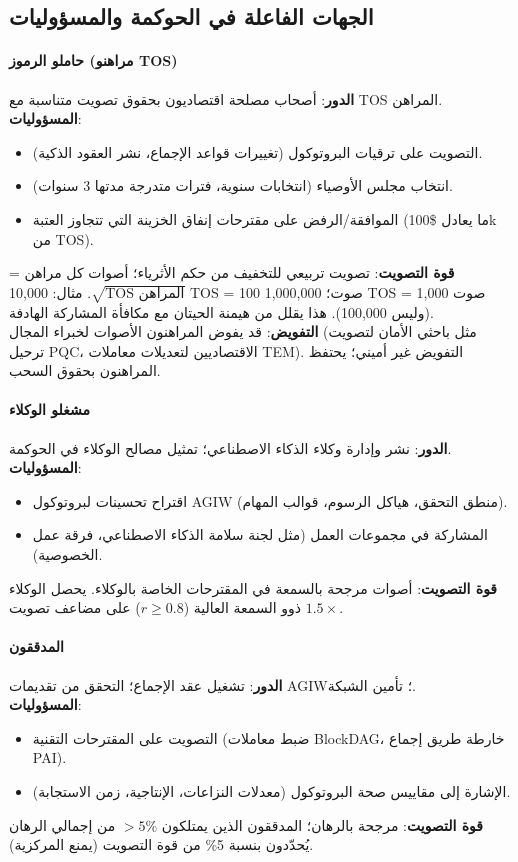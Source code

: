 \documentclass[11pt]{article}
\begin{document}
\subsection{الجهات الفاعلة في الحوكمة والمسؤوليات}

\paragraph{حاملو الرموز (مراهنو TOS)}
\textbf{الدور}: أصحاب مصلحة اقتصاديون بحقوق تصويت متناسبة مع TOS المراهن.\\
\textbf{المسؤوليات}:
\begin{itemize}[noitemsep]
  \item التصويت على ترقيات البروتوكول (تغييرات قواعد الإجماع، نشر العقود الذكية).
  \item انتخاب مجلس الأوصياء (انتخابات سنوية، فترات متدرجة مدتها 3 سنوات).
  \item الموافقة/الرفض على مقترحات إنفاق الخزينة التي تتجاوز العتبة (ما يعادل \$100k من TOS).
\end{itemize}
\textbf{قوة التصويت}: تصويت تربيعي للتخفيف من حكم الأثرياء؛ أصوات كل مراهن = $\sqrt{\text{TOS المراهن}}$. مثال: 10,000 TOS = 100 صوت؛ 1,000,000 TOS = 1,000 صوت (وليس 100,000). هذا يقلل من هيمنة الحيتان مع مكافأة المشاركة الهادفة.\\
\textbf{التفويض}: قد يفوض المراهنون الأصوات لخبراء المجال (مثل باحثي الأمان لتصويت ترحيل PQC، الاقتصاديين لتعديلات معاملات TEM). التفويض غير أميني؛ يحتفظ المراهنون بحقوق السحب.

\paragraph{مشغلو الوكلاء}
\textbf{الدور}: نشر وإدارة وكلاء الذكاء الاصطناعي؛ تمثيل مصالح الوكلاء في الحوكمة.\\
\textbf{المسؤوليات}:
\begin{itemize}[noitemsep]
  \item اقتراح تحسينات لبروتوكول AGIW (منطق التحقق، هياكل الرسوم، قوالب المهام).
  \item المشاركة في مجموعات العمل (مثل لجنة سلامة الذكاء الاصطناعي، فرقة عمل الخصوصية).
\end{itemize}
\textbf{قوة التصويت}: أصوات مرجحة بالسمعة في المقترحات الخاصة بالوكلاء. يحصل الوكلاء ذوو السمعة العالية ($r \geq 0.8$) على مضاعف تصويت $1.5\times$.

\paragraph{المدققون}
\textbf{الدور}: تشغيل عقد الإجماع؛ التحقق من تقديمات AGIW؛ تأمين الشبكة.\\
\textbf{المسؤوليات}:
\begin{itemize}[noitemsep]
  \item التصويت على المقترحات التقنية (ضبط معاملات BlockDAG، خارطة طريق إجماع PAI).
  \item الإشارة إلى مقاييس صحة البروتوكول (معدلات النزاعات، الإنتاجية، زمن الاستجابة).
\end{itemize}
\textbf{قوة التصويت}: مرجحة بالرهان؛ المدققون الذين يمتلكون $>5\%$ من إجمالي الرهان يُحدّدون بنسبة 5\% من قوة التصويت (يمنع المركزية).
\end{document}
